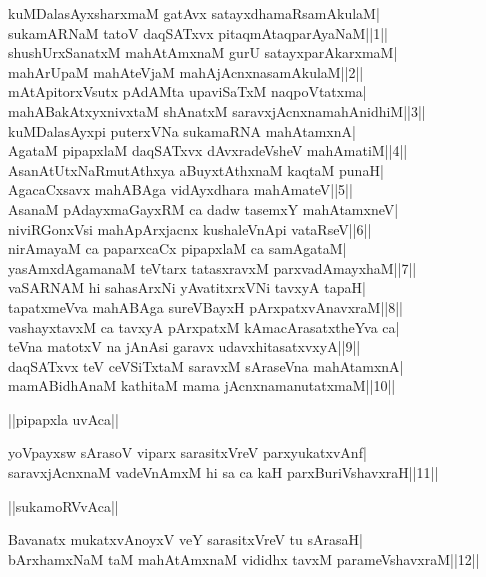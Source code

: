 \documentclass{article}
\begin{document}
kuMDalasAyxsharxmaM gatAvx satayxdhamaRsamAkulaM|\\
sukamARNaM tatoV daqSATxvx pitaqmAtaqparAyaNaM||1||\\
shushUrxSanatxM mahAtAmxnaM gurU satayxparAkarxmaM|\\
mahArUpaM mahAteVjaM mahAjAcnxnasamAkulaM||2||\\
mAtApitorxVsutx pAdAMta upaviSaTxM naqpoVtatxma|\\
mahABakAtxyxnivxtaM shAnatxM saravxjAcnxnamahAnidhiM||3||\\
kuMDalasAyxpi puterxVNa sukamaRNA mahAtamxnA|\\
AgataM pipapxlaM daqSATxvx dAvxradeVsheV mahAmatiM||4||\\
AsanAtUtxNaRmutAthxya aBuyxtAthxnaM kaqtaM punaH|\\
AgacaCxsavx mahABAga vidAyxdhara mahAmateV||5||\\
AsanaM pAdayxmaGayxRM ca dadw tasemxY mahAtamxneV|\\
niviRGonxVsi mahApArxjacnx kushaleVnApi vataRseV||6||\\
nirAmayaM ca paparxcaCx pipapxlaM ca samAgataM|\\
yasAmxdAgamanaM teVtarx tatasxravxM parxvadAmayxhaM||7||\\
vaSARNAM hi sahasArxNi yAvatitxrxVNi tavxyA tapaH|\\
tapatxmeVva mahABAga sureVBayxH pArxpatxvAnavxraM||8||\\
vashayxtavxM ca tavxyA pArxpatxM kAmacArasatxtheYva ca|\\
teVna matotxV na jAnAsi garavx udavxhitasatxvxyA||9||\\
daqSATxvx teV ceVSiTxtaM saravxM sAraseVna mahAtamxnA|\\
mamABidhAnaM kathitaM mama jAcnxnamanutatxmaM||10||\\

\begin{center}
||pipapxla uvAca||
\end{center}

yoVpayxsw sArasoV viparx sarasitxVreV parxyukatxvAnf|\\
saravxjAcnxnaM vadeVnAmxM hi sa ca kaH parxBuriVshavxraH||11||\\

\begin{center}
||sukamoRVvAca||
\end{center}

Bavanatx mukatxvAnoyxV veY sarasitxVreV tu sArasaH|\\
bArxhamxNaM taM mahAtAmxnaM vididhx tavxM parameVshavxraM||12||\\
\end{document}
